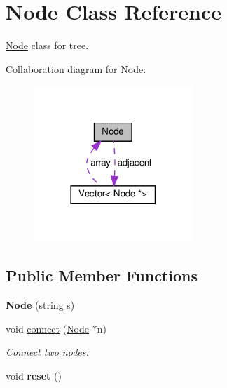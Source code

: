 \hypertarget{classNode}{}\section{Node Class Reference}
\label{classNode}


\hyperlink{classNode}{Node} class for tree.  




Collaboration diagram for Node\+:
\nopagebreak
\begin{figure}[H]
\begin{center}
\leavevmode
\includegraphics[width=170pt]{classNode__coll__graph}
\end{center}
\end{figure}
\subsection*{Public Member Functions}
\begin{DoxyCompactItemize}
\item 
\mbox{\label{classNode_a93070ee4bc38bebbe964a27ca463055b}} 
{\bfseries Node} (string s)
\item 
void \hyperlink{classNode_a527dac60fb4649415fc00fe81da91153}{connect} (\hyperlink{classNode}{Node} $\ast$n)
\begin{DoxyCompactList}\small\item\em Connect two nodes. \end{DoxyCompactList}\item 
\mbox{\label{classNode_a7c565caad2fea0439f28d24887ac2498}} 
void {\bfseries reset} ()
\end{DoxyCompactItemize}
